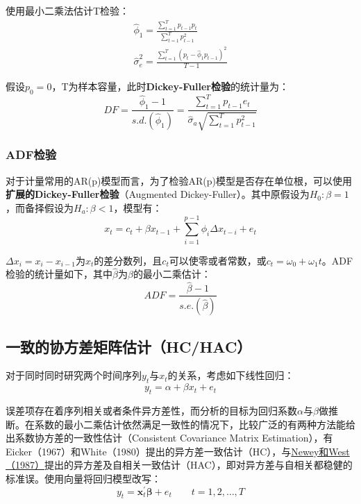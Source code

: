 \documentclass[11pt]{article}
\begin{document}
使用最小二乘法估计T检验：
\begin{gather*}
    \hat{\phi}_1 = \frac{\sum_{t=1}^{T} p_{t-1}p_t}{\sum_{t=1}^{T} p_{t-1}^{2}} \\
    \hat{\sigma}_{e}^{2} = \frac{\sum_{t=1}^{T} \left(p_t - \hat{\phi}_1 p_{t-1} \right)^2}{T-1}
\end{gather*}

假设$p_0=0$，T为样本容量，此时\textbf{Dickey-Fuller检验}的统计量为：
\begin{equation*}
    DF = \frac{\hat{\phi}_1 - 1}{s.d.(\hat{\phi}_1)}
    = \frac{\sum_{t=1}^{T} p_{t-1} e_t}{\hat{\sigma}_{a} \sqrt{\sum_{t=1}^{T} p_{t-1}^{2}}} 
\end{equation*}

\subsubsection{ADF检验}

对于计量常用的AR(p)模型而言，为了检验AR(p)模型是否存在单位根，可以使用\textbf{扩展的Dickey-Fuller检验}（Augmented Dickey-Fuller）。其中原假设为$H_0: \beta=1$，而备择假设为$H_a: \beta<1$，模型有：
\begin{equation*}
    x_t = c_t + \beta x_{t-1} + \sum_{i=1}^{p-1}\phi_i \Delta x_{t-i} + e_t
\end{equation*}

$\Delta x_{i}= x_i -x_{i-1}$为$x_t$的差分数列，且$c_t$可以使零或者常数，或$c_t=\omega_0 + \omega_1 t$。ADF检验的统计量如下，其中$\hat{\beta}$为$\beta$的最小二乘估计：
\begin{equation*}
    ADF = \frac{\hat{\beta}-1}{s.e.(\hat{\beta})}
\end{equation*}

\subsection{一致的协方差矩阵估计（HC/HAC）}

对于同时同时研究两个时间序列$y_t$与$x_t$的关系，考虑如下线性回归：
\begin{equation*}
    y_t = \alpha + \beta x_t + e_t
\end{equation*}

误差项存在着序列相关或者条件异方差性，而分析的目标为回归系数$\alpha$与$\beta$做推断。在系数的最小二乘估计依然满足一致性的情况下，比较广泛的有两种方法能给出系数协方差的一致性估计（Consistent Covariance Matrix Estimation），有Eicker（1967）和White（1980）提出的异方差一致估计（HC），与\uline{Newey和West（1987）}提出的异方差及自相关一致估计（HAC），即对异方差与自相关都稳健的标准误。使用向量将回归模型改写：
\begin{equation*}
    y_t = \bm{x}_{t}^{'} \bm{\beta} + e_t \qquad t=1,2,\dots,T
\end{equation*}
\end{document}
